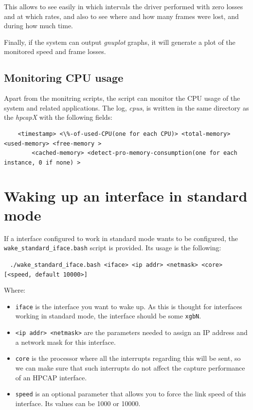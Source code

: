 \documentclass[a4paper,oneside]{hpman}
\begin{document}
This allows to see easily in which intervals the driver performed with zero losses and at which rates, and also to see where and how many frames were lost, and during how much time.

Finally, if the system can output \textit{gnuplot} graphs, it will generate a plot of the monitored speed and frame losses.

\subsection{Monitoring CPU usage}

Apart from the monitring scripts, the script  can monitor the CPU usage of the system and related applications. The log, \textit{cpus}, is written in the same directory as the \textit{hpcapX} with the following fields:

\begin{verbatim}
    <timestamp> <\%-of-used-CPU(one for each CPU)> <total-memory> <used-memory> <free-memory >
        <cached-memory> <detect-pro-memory-consumption(one for each instance, 0 if none) >
\end{verbatim}

\section{Waking up an interface in standard mode}
\label{subs:standard}

If a interface configured to work in standard mode wants to be configured, the \texttt{wake\_standard\_iface.bash} script is provided. Its usage is the following:

$\;\;$ \texttt{./wake\_standard\_iface.bash <iface> <ip addr> <netmask> <core> [<speed, default 10000>]}

Where:
\begin{itemize}
    \item \texttt{iface} is the interface you want to wake up. As this is thought for interfaces working in standard mode, the interface should be some \texttt{xgbN}.

    \item \texttt{<ip addr> <netmask>} are the parameters needed to assign an IP address and a network mask for this interface.

    \item \texttt{core} is the processor where all the interrupts regarding this will be sent, so we can make sure that such interrupts do not affect the capture performance of an HPCAP interface.
    \item \texttt{speed} is an optional parameter that allows you to force the link speed of this interface. Its values can be 1000 or 10000.

\end{itemize}
\end{document}
